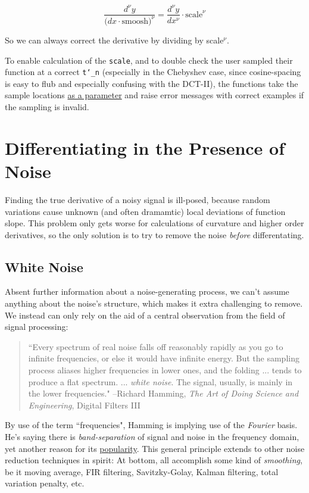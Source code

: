 \documentclass[10pt]{article}
\begin{document}
$$\frac{d^\nu y}{\big( dx \cdot \text{smoosh})^\nu} = \frac{d^\nu y}{dx^\nu} \cdot \text{scale}^\nu$$

\noindent So we can always correct the derivative by dividing by scale$^\nu$.

To enable calculation of the \texttt{scale}, and to double check the user sampled their function at a correct \texttt{t\char`_n} (especially in the Chebyshev case, since cosine-spacing is easy to flub and especially confusing with the DCT-II), the functions take the sample locations \href{https://pavelkomarov.com/spectral-derivatives/specderiv.html}{as a parameter} and raise error messages with correct examples if the sampling is invalid.

\section{Differentiating in the Presence of Noise}

Finding the true derivative of a noisy signal is ill-posed, because random variations cause unknown (and often dramamtic) local deviations of function slope. This problem only gets worse for calculations of curvature and higher order derivatives, so the only solution is to try to remove the noise \textit{before} differentating.

\subsection{White Noise}

Absent further information about a noise-generating process, we can't assume anything about the noise's structure, which makes it extra challenging to remove. We instead can only rely on the aid of a central observation from the field of signal processing:

\begin{quotation}
``Every spectrum of real noise falls off reasonably rapidly as you go to infinite frequencies, or else it would have infinite energy. But the sampling process aliases higher frequencies in lower ones, and the folding ... tends to produce a flat spectrum. ... \textit{white noise}. The signal, usually, is mainly in the lower frequencies." --Richard Hamming, \textit{The Art of Doing Science and Engineering}\cite{hamming}, Digital Filters III
\end{quotation}

By use of the term ``frequencies", Hamming is implying use of the \textit{Fourier} basis. He's saying there is \textit{band-separation} of signal and noise in the frequency domain, yet another reason for its \hyperref[whyfourier]{popularity}. This general principle extends to other noise reduction techniques in spirit: At bottom, all accomplish some kind of \textit{smoothing}, be it moving average, FIR filtering, Savitzky-Golay, Kalman filtering, total variation penalty, etc.
\end{document}
